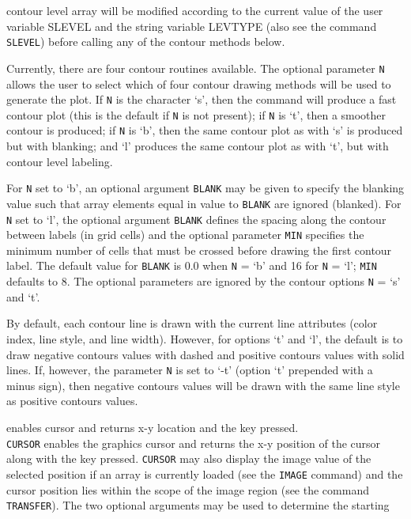 	contour level array will be modified according to the current
	value of the user variable SLEVEL and the string variable
	LEVTYPE (also see the command {\tt SLEVEL})
	before calling any of the contour methods below.
	\par 
	Currently, there are four contour routines available.  The
	optional parameter {\tt N} allows the user to select
	which of four contour drawing methods will be used to generate
	the plot.  If {\tt N} is the character `s', then the
	command will produce a fast contour plot (this is the default
	if {\tt N} is not present); if {\tt N} is `t',
	then a smoother contour is produced; if {\tt N} is `b',
	then the same contour plot as with `s' is produced but with
	blanking; and `l' produces the same contour plot as with `t',
	but with contour level labeling.
	\par 
	For {\tt N} set to `b', an optional argument
	{\tt BLANK} may be given to specify the blanking value
	such that array elements equal in value to {\tt BLANK}
	are ignored (blanked).  For {\tt N} set to `l', the
	optional argument {\tt BLANK} defines the spacing along
	the contour between labels (in grid cells) and the optional
	parameter {\tt MIN} specifies the minimum number of
	cells that must be crossed before drawing the first contour
	label.  The default value for {\tt BLANK} is 0.0 when
	{\tt N} = `b' and 16 for {\tt N} = `l';
	{\tt MIN} defaults to 8.  The optional parameters are
	ignored by the contour options {\tt N} = `s' and `t'.
	\par 
	By default, each contour line is drawn with the current line
	attributes (color index, line style, and line width).  However,
	for options `t' and `l', the default is to draw negative contours
	values with dashed and positive contours values with solid lines.
	If, however, the parameter {\tt N} is set to `-t'
	(option `t' prepended with a minus sign), then negative contours
	values will be drawn with the same line style as positive
	contours values.
\item [{\tt CURSOR [x y] } --] enables cursor and returns x-y location and the key pressed.\\
	{\tt CURSOR} enables the graphics cursor and returns the
	x-y position of the cursor along with the key pressed.
	{\tt CURSOR} may also display the image value of the
	selected position if an array is currently loaded (see the
	{\tt IMAGE} command) and the cursor
	position lies within the scope of the image region (see the
	command {\tt TRANSFER}).  The two
	optional arguments may be used to determine the starting
